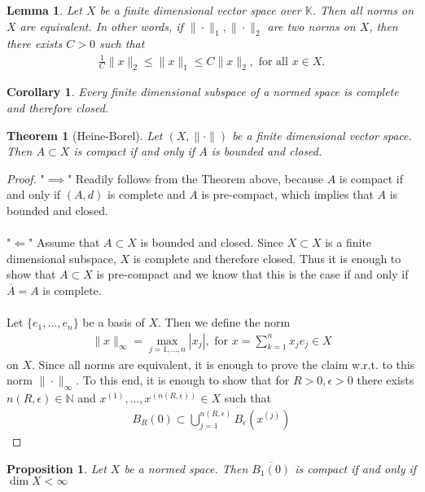 \documentclass[11pt,a4paper]{article}
\newtheorem{lem}{Lemma}[section]
\newtheorem{thm}{Theorem}[section]
\newtheorem{prop}{Proposition}[section]
\newtheorem{cor}{Corollary}[section]
\theoremstyle{definition}
\begin{document}
\begin{lem} Let $X$ be a finite dimensional vector space over $\mathbb{K}$. Then all norms on $X$ are equivalent. In other words, if $\| \cdot \|_1,  \| \cdot \|_2$ are two norms on $X$, then there exists $C>0$ such that 
\begin{align*}
\frac{1}{C} \|x\|_2 \leq \|x\|_1 \leq C \|x\|_2, \text{ for all } x \in X. 
\end{align*}
\end{lem}
\begin{cor} Every finite dimensional subspace of a normed space is complete and therefore closed. 
\end{cor}
\newpage
\begin{thm}[Heine-Borel] Let $(X, \| \cdot\|)$ be a finite dimensional vector space. Then $A \subset X$ is compact if and only if $A$ is bounded and closed.  
\end{thm}
\begin{proof}
"$\implies$" Readily follows from the Theorem above, because $A$ is compact if and only if $(A,d)$ is complete and $A$ is pre-compact, which implies that $A$ is bounded and closed. 
\\\\
"$\Longleftarrow$" Assume that $A \subset X$ is bounded and closed. Since $X \subset X$ is a finite dimensional subspace, $X$ is complete and therefore closed. Thus it is enough to show that $A \subset X$ is pre-compact and we know that this is the case if and only if $\overline{A}=A$ is complete. 
\\\\
Let $\lbrace e_1, \dots , e_n \rbrace$ be a basis of $X$. Then we define the norm \begin{align*}
\|x\|_\infty = \max_{j=1, \dots , n} | x_j|, \text{ for } x = \sum_{k=1}^n x_j e_j \in X
\end{align*}
on $X$. Since all norms are equivalent, it is enough to prove the claim w.r.t. to this norm $\| \cdot \|_\infty$. To this end, it is enough to show that for $R>0, \epsilon >0$ there exists $n(R, \epsilon) \in \mathbb{N}$ and $x^{(1)}, \dots , x^{(n(R, \epsilon))} \in X$ such that \begin{align*}
B_R(0) \subset \bigcup_{j=1}^{n(R, \epsilon)} B_\epsilon (x^{(j)}) 
\end{align*}
\end{proof}
\begin{prop} \label{compactunitball} Let $X$ be a normed space. Then $\overline{B_1(0)}$ is compact if and only if $\dim X < \infty$
\end{prop}
\end{document}
